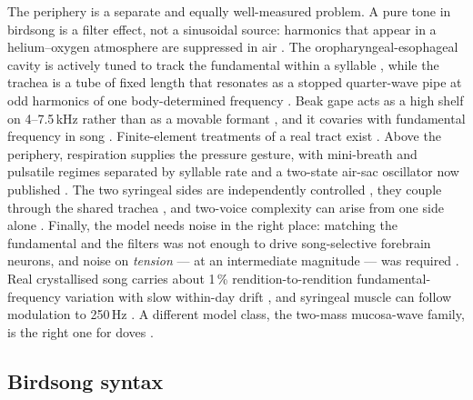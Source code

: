 \documentclass[10pt,twocolumn,a4paper]{article}
\begin{document}
The periphery is a separate and equally well-measured problem. A pure tone in birdsong is
a filter effect, not a sinusoidal source: harmonics that appear in a helium--oxygen
atmosphere are suppressed in air \citep{nowicki1987,beckers2003}. The
oropharyngeal-esophageal cavity is actively tuned to track the fundamental within a
syllable \citep{riede2006}, while the trachea is a tube of fixed length that resonates as a
stopped quarter-wave pipe at odd harmonics of one body-determined
frequency \citep{nelson2005,riede2009}. Beak gape acts as a high shelf on 4--7.5\,kHz
rather than as a movable formant \citep{nelson2005}, and it covaries with fundamental
frequency in song \citep{ohms2010,podos2004}. Finite-element treatments of a real tract
exist \citep{fletcher2006,kazemi2023}. Above the periphery, respiration supplies the
pressure gesture, with mini-breath and pulsatile regimes separated by syllable
rate \citep{hartley1989} and a two-state air-sac oscillator now
published \citep{fainstein2025}. The two syringeal sides are independently
controlled \citep{suthers1990,goller1996a}, they couple through the shared
trachea \citep{laje2005}, and two-voice complexity can arise from one side
alone \citep{zollinger2008}. Finally, the model needs noise in the right place: matching
the fundamental and the filters was not enough to drive song-selective forebrain neurons,
and noise on \emph{tension} --- at an intermediate magnitude --- was
required \citep{amador2021}. Real crystallised song carries about 1\,\% rendition-to-rendition
fundamental-frequency variation \citep{tumer2007} with slow within-day
drift \citep{wood2013}, and syringeal muscle can follow modulation to
250\,Hz \citep{elemans2008,riedegoller2010}. A different model class, the two-mass
mucosa-wave family, is the right one for doves \citep{elemans2008dove}.

\subsection{Birdsong syntax}
\end{document}
